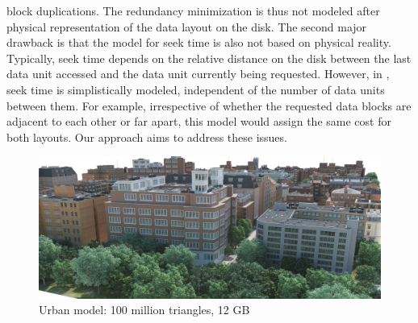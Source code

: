 block duplications. The redundancy minimization is thus not modeled after
physical representation of the data layout on the disk. The second major
drawback is that the model for seek time is also not based on physical reality.
Typically, seek time depends on the relative distance on the disk between the
last data unit accessed and the data unit currently being requested. However,
in \cite{optimizingredundancy}, seek time is simplistically modeled,
independent of the number of data units between them. For example,
irrespective of whether the requested data blocks are adjacent to
each other or far apart, this model would assign the same cost for both
layouts. Our approach
aims to address these issues. 


\begin{figure}[t]
  \centering
  \includegraphics[width=\columnwidth]{densecity.jpg}
  \caption{Urban model: 100 million triangles, 12 GB }
  \label{fig:model3}
\end{figure}


